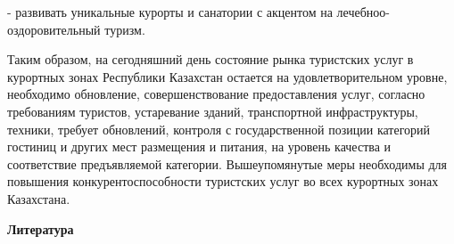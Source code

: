 \begin{multicols}{2}
- развивать уникальные курорты и санатории с акцентом на
лечебноо-оздоровительный туризм.

Таким образом, на сегодняшний день состояние рынка туристских услуг в
курортных зонах Республики Казахстан остается на удовлетворительном
уровне, необходимо обновление, совершенствование предоставления услуг,
согласно требованиям туристов, устаревание зданий, транспортной
инфраструктуры, техники, требует обновлений, контроля с государственной
позиции категорий гостиниц и других мест размещения и питания, на
уровень качества и соответствие предъявляемой категории. Вышеупомянутые
меры необходимы для повышения конкурентоспособности туристских услуг во
всех курортных зонах Казахстана.
\end{multicols}

\begin{center}
{\bfseries Литература}
\end{center}

